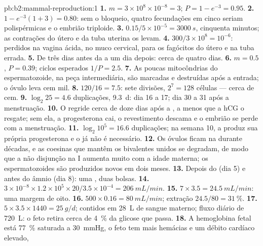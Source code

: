 \begin{solution}{pb:b2:mammal-reproduction:1}
\textbf{1.} $m = 3\times 10^{8}\times 10^{-8} = 3$; $P = 1 - e^{-3} =
0.95$.
\textbf{2.} $1 - e^{-3}(1 + 3) = 0.80$: sem o bloqueio, quatro
fecundações em cinco seriam polispérmicas e o embrião triploide.
\textbf{3.} $0.15/5\times 10^{-5} = \qty{3000}{s}$, cinquenta minutos;
as contrações do útero e da tuba uterina os levam.
\textbf{4.} $300/3\times 10^{8} = 10^{-6}$: perdidos na vagina ácida,
no muco cervical, para os fagócitos do útero e na tuba errada.
\textbf{5.} De três dias antes da  a um dia depois: cerca de
quatro dias.
\textbf{6.} $m = 0.5$, $P = 0.39$; ciclos esperados $1/P = 2.5$.
\textbf{7.} As poucas mitocôndrias do espermatozoide, na peça
intermediária, são marcadas e destruídas após a entrada; o óvulo leva
cem mil.
\textbf{8.} $120/16 = 7.5$: sete divisões, $2^{7} = 128$ células ---
cerca de cem.
\textbf{9.} $\log_2 25 = 4.6$ duplicações, \qty{9.3}{d}: dia 16 a 17;
dia 30 a 31 após a menstruação.
\textbf{10.} O  regride cerca de doze dias após a ,
a menos que a hCG o resgate; sem ela, a progesterona cai, o
revestimento descama e o embrião se perde com a menstruação.
\textbf{11.} $\log_2 10^{5} = 16.6$ duplicações; na semana 10, a
 produz sua própria progesterona e o  já não é
necessário.
\textbf{12.} Os óvulos ficam na  durante décadas, e as
coesinas que mantêm os bivalentes unidos se degradam, de modo que a
não disjunção na  I aumenta muito com a idade materna; os
espermatozoides são produzidos novos em dois meses.
\textbf{13.} Depois do  (dia 5) e antes do âmnio (dia 8):
uma , duas bolsas.
\textbf{14.} $3\times 10^{-8}\times 1.2\times 10^{5}\times 20/3.5\times
10^{-4} = \qty{206}{mL/min}$.
\textbf{15.} $7\times 3.5 = \qty{24.5}{mL/min}$: uma margem de oito.
\textbf{16.} $500\times 0.16 = \qty{80}{mL/min}$; extração
$24.5/80 = \qty{31}{\%}$.
\textbf{17.} $5\times 3.5\times 1440 = \qty{25}{g/d}$; contidos em
\qty{28}{L} de sangue materno; fluxo diário de \qty{720}{L}: o feto
retira cerca de \qty{4}{\%} da glicose que passa.
\textbf{18.} A hemoglobina fetal está \qty{77}{\%} saturada a
\qty{30}{mmHg}, o feto tem mais hemácias e um débito cardíaco elevado,

\end{solution}
